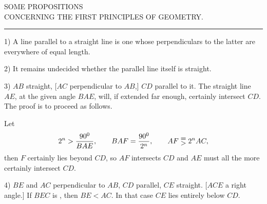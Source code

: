 \clearpage
{}
\begin{center}
SOME PROPOSITIONS\\
CONCERNING THE FIRST PRINCIPLES OF GEOMETRY.
\end{center}

\medskip
\begin{center}
\rule{0.15\textwidth}{0.4pt}
\end{center}
\medskip

1) A line parallel to a straight line is one whose
perpendiculars to the latter are everywhere of equal length.

2) It remains undecided whether the parallel line itself is straight.

3) $AB$ straight, [$AC$ perpendicular to $AB$,] $CD$ parallel to it.
The straight line $AE$, at the given angle $BAE$, will, if extended far enough,
certainly intersect $CD$. The proof is to proceed as follows.

\begin{center}\end{center}

Let
\[
2^n > \frac{90^{0}}{BAE}, \qquad BAF = \frac{90^{0}}{2^n}, \qquad
AF \EqualsOverGreater{} 2^n AC, 
\]
then $F$ certainly lies beyond $CD$, so $AF$ intersects $CD$ and
$AE$ must all the more certainly intersect $CD$.

4) $BE$ and $AC$ perpendicular to $AB$, $CD$ parallel, $CE$ straight.
[$ACE$ a right angle.] If $BEC$ is , then $BE < AC$. In that case
$CE$ lies entirely below $CD$.

\begin{center}\end{center}

